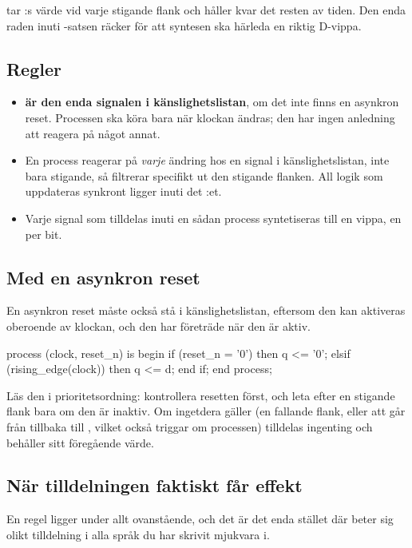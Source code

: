  tar :s värde vid varje stigande flank och håller kvar det resten av tiden. Den
enda raden inuti -satsen räcker för att syntesen ska härleda en riktig D-vippa.

\subsection*{Regler}
\begin{itemize}
  \item \textbf{ är den enda signalen i känslighetslistan}, om det inte finns en
    asynkron reset. Processen ska köra bara när klockan ändras; den har ingen anledning att reagera
    på något annat.
  \item En process reagerar på \emph{varje} ändring hos en signal i känslighetslistan, inte bara
    stigande, så  filtrerar specifikt ut den stigande flanken. All logik som
    uppdateras synkront ligger inuti det :et.
  \item Varje signal som tilldelas inuti en sådan process syntetiseras till en vippa, en per bit.
\end{itemize}

\subsection*{Med en asynkron reset}
En asynkron reset måste också stå i känslighetslistan, eftersom den kan aktiveras oberoende av
klockan, och den har företräde när den är aktiv.

\begin{vhdlcode}
process (clock, reset_n) is
begin
    if (reset_n = '0') then
        q <= '0';
    elsif (rising_edge(clock)) then
        q <= d;
    end if;
end process;
\end{vhdlcode}

Läs den i prioritetsordning: kontrollera resetten först, och leta efter en stigande flank bara om
den är inaktiv. Om ingetdera gäller (en fallande flank, eller att  går från 
tillbaka till , vilket också triggar om processen) tilldelas ingenting och  behåller
sitt föregående värde.

\subsection*{När tilldelningen faktiskt får effekt}
En regel ligger under allt ovanstående, och det är det enda stället där \code{<=} beter sig olikt
tilldelning i alla språk du har skrivit mjukvara i.

